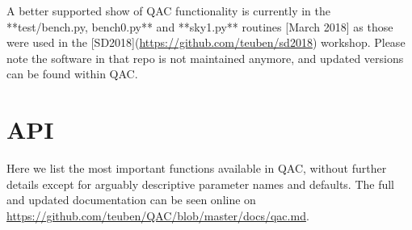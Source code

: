 \documentclass[11pt,twoside]{article}
\begin{document}
A better supported show of QAC functionality is currently in the **test/bench.py, bench0.py** and **sky1.py** routines [March 2018]
as those were used in the
[SD2018](\url{https://github.com/teuben/sd2018}) workshop. Please note the software in that repo is not maintained anymore,
and updated versions can be found
within QAC.

\section{API}

Here we list the most important functions available in QAC, without
further details except for arguably descriptive parameter names and
defaults. The full and updated documentation can be seen online on
\url{https://github.com/teuben/QAC/blob/master/docs/qac.md}.
\end{document}
